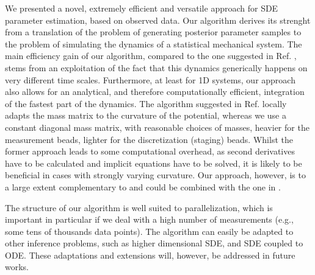 \documentclass[11pt]{article}
\theoremstyle{definition}
\begin{document}
We presented a novel, extremely efficient and versatile approach for SDE parameter estimation, based on observed data.
Our algorithm derives its strenght from a translation of the problem of generating posterior parameter samples to the problem of simulating the dynamics of a statistical mechanical system.
The main efficiency gain of our algorithm, compared to the one suggested in Ref. \cite{girolami_2011_HMC}, stems from an exploitation of the fact that this dynamics generically happens on very different time scales. 
Furthermore, at least for 1D systems, our approach also allows for an analytical, and therefore computationally efficient, integration of the fastest part of the dynamics. 
The algorithm suggested in Ref. \cite{girolami_2011_HMC} locally adapts the mass matrix to the curvature of the potential, whereas we use a constant diagonal mass matrix, with reasonable choices of masses, heavier for the measurement beads, lighter for the discretization (staging) beads.
Whilst the former approach leads to some computational overhead, as second derivatives have to be calculated and implicit equations have to be solved, it is likely to be beneficial in cases with strongly varying curvature. 
Our approach, however, is to a large extent complementary to and could be combined with the one in \cite{girolami_2011_HMC}.


The structure of our algorithm is well suited to parallelization, which is important in particular if we deal with a high number of measurements (e.g., some tens of thousands data points). The algorithm can easily be adapted to other inference problems, such as higher dimensional SDE, and SDE coupled to ODE. These adaptations and extensions will, however, be addressed in future works.
\end{document}
